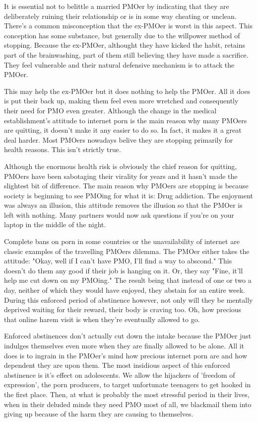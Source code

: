 \documentclass[easypeasy.tex]{subfiles}
\begin{document}
It is essential not to belittle a married PMOer by indicating that they are deliberately ruining their relationship or is in some way cheating or unclean. There's a common misconception that the ex-PMOer is worst in this aspect. This conception has some substance, but generally due to the willpower method of stopping. Because the ex-PMOer, althought they have kicked the habit, retains part of the brainwashing, part of them still believing they have made a sacrifice. They feel vulnerable and their natural defensive mechanism is to attack the PMOer.

This may help the ex-PMOer but it does nothing to help the PMOer. All it does is put their back up, making them feel even more wretched and consequently their need for PMO even greater. Although the change in the medical establishment's attitude to internet porn is the main reason why many PMOers are quitting, it doesn't make it any easier to do so. In fact, it makes it a great deal harder. Most PMOers nowadays belive they are stopping primarily for health reasons. This isn't strictly true.

Although the enormous health risk is obviously the chief reason for quitting, PMOers have been sabotaging their virality for years and it hasn't made the slightest bit of difference. The main reason why PMOers are stopping is because society is beginning to see PMOing for what it is: Drug addiction. The enjoyment was always an illusion, this attitude removes the illusion so that the PMOer is left with nothing. Many partners would now ask questions if you're on your laptop in the middle of the night.

Complete bans on porn in some countries or the unavailability of internet are classic examples of the travelling PMOers dilemma. The PMOer either takes the attitude: "Okay, well if I can't have PMO, I'll find a way to abscond." This doesn't do them any good if their job is hanging on it. Or, they say "Fine, it'll help me cut down on my PMOing." The result being that instead of one or two a day, neither of which they would have enjoyed, they abstain for an entire week. During this enforced period of abstinence however, not only will they be mentally deprived waiting for their reward, their body is craving too. Oh, how precious that online harem visit is when they're eventually allowed to go.

Enforced abstinences don't actually cut down the intake because the PMOer just indulges themselves even more when they are finally allowed to be alone. All it does is to ingrain in the PMOer's mind how precious internet porn are and how dependent they are upon them. The most insidious aspect of this enforced abstinence is it's effect on adolescents. We allow the hijackers of 'freedom of expression', the porn producers, to target unfortunate teenagers to get hooked in the first place. Then, at what is probably the most stressful period in their lives, when in their deluded minds they need PMO most of all, we blackmail them into giving up because of the harm they are causing to themselves.
\end{document}
